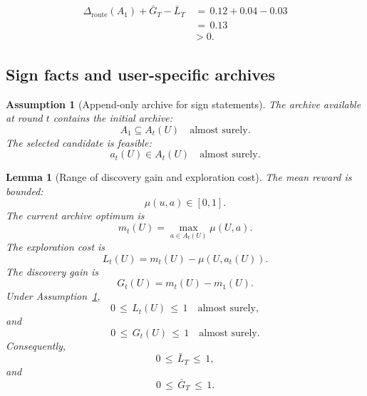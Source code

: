 \documentclass{article} %
\newtheorem{lemma}[theorem]{Lemma}
\newtheorem{assumption}{Assumption}
\begin{document}
\begin{align}
\label{eq:app-fourth-dom-example-reserve}
\Delta_{\mathrm{route}}(A_1)+\bar G_T-\bar L_T
&\,=\,
0.12+0.04-0.03
\\
&\,=\,
0.13
\\
&>
0.
\end{align}

\subsection{Sign facts and user-specific archives}

\begin{assumption}[Append-only archive for sign statements]
\label{assump:app-append-only}
The archive available at round \(t\) contains the initial archive:
\begin{equation}
\label{eq:app-fourth-append-only}
A_1
\subseteq
A_t(U)
\quad
\text{almost surely}.
\end{equation}
The selected candidate is feasible:
\begin{equation}
\label{eq:app-fourth-feasible}
a_t(U)
\in
A_t(U)
\quad
\text{almost surely}.
\end{equation}
\end{assumption}

\begin{lemma}[Range of discovery gain and exploration cost]
\label{lem:range-discovery-exploration}
The mean reward is bounded:
\begin{equation}
\label{eq:app-fourth-range-mu}
\mu(u,a)\in[0,1].
\end{equation}
The current archive optimum is
\begin{equation}
\label{eq:app-fourth-range-mt}
m_t(U)
=
\max_{a\in A_t(U)}
\mu(U,a).
\end{equation}
The exploration cost is
\begin{equation}
\label{eq:app-fourth-range-lt}
L_t(U)
=
m_t(U)-\mu(U,a_t(U)).
\end{equation}
The discovery gain is
\begin{equation}
\label{eq:app-fourth-range-gt}
G_t(U)
=
m_t(U)-m_1(U).
\end{equation}
Under Assumption~\ref{assump:app-append-only},
\begin{equation}
\label{eq:app-fourth-range-l-bound}
0
\,\le\,
L_t(U)
\,\le\,
1
\quad
\text{almost surely},
\end{equation}
and
\begin{equation}
\label{eq:app-fourth-range-g-bound}
0
\,\le\,
G_t(U)
\,\le\,
1
\quad
\text{almost surely}.
\end{equation}
Consequently,
\begin{equation}
\label{eq:app-fourth-range-avg-l}
0
\,\le\,
\bar L_T
\,\le\,
1,
\end{equation}
and
\begin{equation}
\label{eq:app-fourth-range-avg-g}
0
\,\le\,
\bar G_T
\,\le\,
1.
\end{equation}
\end{lemma}
\end{document}
